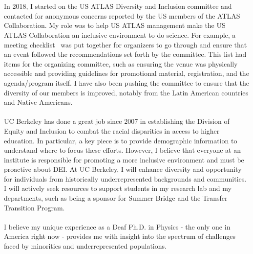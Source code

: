 \documentclass[10pt,a4paper,sans]{moderncv/moderncv} %
\begin{document}
\\
\\
In 2018, I started on the US ATLAS Diversity and Inclusion committee and contacted for anonymous concerns reported by the US members of the ATLAS Collaboration. My role was to help US ATLAS management make the US ATLAS Collaboration an inclusive environment to do science. For example, a meeting checklist~\cite{SnowmassLOI} was put together for organizers to go through and ensure that an event followed the recommendations set forth by the committee. This list had items for the organizing committee, such as ensuring the venue was physically accessible and providing guidelines for promotional material, registration, and the agenda/program itself. I have also been pushing the committee to ensure that the diversity of our members is improved, notably from the Latin American countries and Native Americans.
\\
\\
UC Berkeley has done a great job since 2007 in establishing the Division of Equity and Inclusion to combat the racial disparities in access to higher education. In particular, a key piece is to provide demographic information to understand where to focus these efforts. However, I believe that everyone at an institute is responsible for promoting a more inclusive environment and must be proactive about DEI. At UC Berkeley, I will enhance diversity and opportunity for individuals from historically underrepresented backgrounds and communities. I will actively seek resources to support students in my research lab and my departments, such as being a sponsor for Summer Bridge and the Transfer Transition Program.
\\
\\
I believe my unique experience as a Deaf Ph.D. in Physics - the only one in America right now - provides me with insight into the spectrum of challenges faced by minorities and underrepresented populations.

\end{document}
